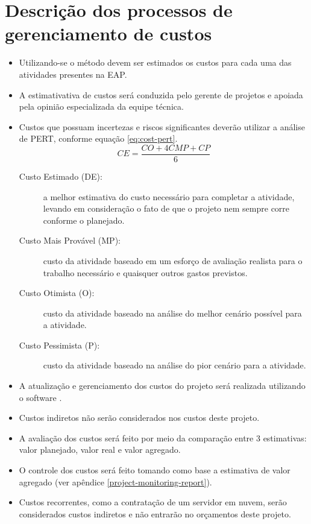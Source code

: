 \section{Descrição dos processos de gerenciamento de custos}

\begin{itemize}
	\item Utilizando-se o método  devem ser estimados os custos para cada uma das atividades presentes na EAP.
	\item A estimativativa de custos será conduzida pelo gerente de projetos e apoiada pela opinião especializada da equipe técnica.
	\item Custos que possuam incertezas e riscos significantes deverão utilizar a análise de PERT, conforme equação \ref{eq:cost-pert}.
	      \begin{equation}\label{eq:cost-pert}
		      CE = \frac{CO+4CMP+CP}{6}
	      \end{equation}
	      \begin{description}
		      \item[Custo Estimado (DE):] a melhor estimativa do custo necessário para completar a atividade, levando em consideração o fato de que o projeto nem sempre corre conforme o planejado.
		      \item[Custo Mais Provável (MP):] custo da atividade baseado em um esforço de avaliação realista para o trabalho necessário e quaisquer outros gastos previstos.
		      \item[Custo Otimista (O):] custo da atividade baseado na análise do melhor cenário possível para a atividade.
		      \item[Custo Pessimista (P):] custo da atividade baseado na análise do pior cenário para a atividade.
	      \end{description}
	\item A atualização e gerenciamento dos custos do projeto será realizada utilizando o software \projectManagementSoftwareName{}.
	\item Custos indiretos não serão considerados nos custos deste projeto.
	\item A avaliação dos custos será feito por meio da comparação entre 3 estimativas: valor planejado, valor real e valor agregado.
	\item O controle dos custos será feito tomando como base a estimativa de valor agregado (ver apêndice \ref{project-monitoring-report}).
	\item Custos recorrentes, como a contratação de um servidor em nuvem, serão considerados custos indiretos e não entrarão no orçamentos deste projeto.
\end{itemize}

